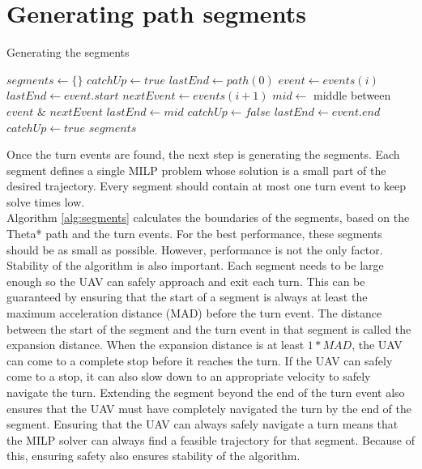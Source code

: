 \section{Generating path segments}
\begin{algorithm}
\caption{Generating the segments}
\label{alg:segments}
\begin{algorithmic}[1]
\State $segments \leftarrow \{\}$
\State $catchUp \leftarrow true$
\State $lastEnd \leftarrow path(0)$
\State $event \leftarrow events(i)$
	\State {} 
	\State {}
	\State $lastEnd \leftarrow event.start$
\EndIf
\State $nextEvent \leftarrow events(i+1)$
	\State $mid \leftarrow$ middle between $event$ \& $nextEvent$
	\State {}
	\State $lastEnd \leftarrow mid$
	\State $catchUp \leftarrow false$
\Else
	\State {} 
	\State {}
	\State $lastEnd \leftarrow event.end$
	\State $catchUp \leftarrow true$
\EndIf
\EndFor
\State {}
\Return $segments$
\EndFunction
\end{algorithmic}
\end{algorithm}
Once the turn events are found, the next step is generating the segments. Each segment defines a single MILP problem whose solution is a small part of the desired trajectory. Every segment should contain at most one turn event to keep solve times low.\\
Algorithm \ref{alg:segments} calculates the boundaries of the segments, based on the Theta* path and the turn events. For the best performance, these segments should be as small as possible. However, performance is not the only factor. Stability of the algorithm is also important. Each segment needs to be large enough so the UAV can safely approach and exit each turn. This can be guaranteed by ensuring that the start of a segment is always at least the maximum acceleration distance (MAD) before the turn event. The distance between the start of the segment and the turn event in that segment is called the expansion distance. When the expansion distance is at least $1*MAD$, the UAV can come to a complete stop before it reaches the turn. If the UAV can safely come to a stop, it can also slow down to an appropriate velocity to safely navigate the turn. Extending the segment beyond the end of the turn event also ensures that the UAV must have completely navigated the turn by the end of the segment. Ensuring that the UAV can always safely navigate a turn means that the MILP solver can always find a feasible trajectory for that segment. Because of this, ensuring  safety also ensures stability of the algorithm. \\
